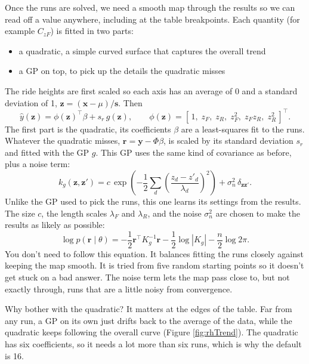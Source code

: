 Once the runs are solved, we need a smooth map through the results so we can read off a value anywhere, including at the table breakpoints. Each quantity (for example $C_{zF}$) is fitted in two parts:
\begin{itemize}
    \item a quadratic, a simple curved surface that captures the overall trend
    \item a GP on top, to pick up the details the quadratic misses
\end{itemize}
The ride heights are first scaled so each axis has an average of 0 and a standard deviation of 1, $\mathbf{z} = (\mathbf{x} - \mu)/\mathbf{s}$. Then
\begin{equation}
    \hat y(\mathbf{z}) = \phi(\mathbf{z})^{\top}\beta + s_r\,g(\mathbf{z}), \qquad \phi(\mathbf{z}) = \left[\,1,\; z_F,\; z_R,\; z_F^2,\; z_F z_R,\; z_R^2\,\right]^{\top}.
\end{equation}
The first part is the quadratic, its coefficients $\beta$ are a least-squares fit to the runs. Whatever the quadratic misses, $\mathbf{r} = \mathbf{y} - \Phi\beta$, is scaled by its standard deviation $s_r$ and fitted with the GP $g$. This GP uses the same kind of covariance as before, plus a noise term:
\begin{equation}
    k_g(\mathbf{z}, \mathbf{z}') = c\,\exp\!\left(-\frac{1}{2}\sum_d \left(\frac{z_d - z'_d}{\lambda_d}\right)^2\right) + \sigma_n^2\,\delta_{\mathbf{z}\mathbf{z}'} .
\end{equation}
Unlike the GP used to pick the runs, this one learns its settings from the results. The size $c$, the length scales $\lambda_F$ and $\lambda_R$, and the noise $\sigma_n^2$ are chosen to make the results as likely as possible:
\begin{equation}
    \log p(\mathbf{r} \mid \theta) = -\frac{1}{2}\mathbf{r}^{\top}K_g^{-1}\mathbf{r} - \frac{1}{2}\log|K_g| - \frac{n}{2}\log 2\pi.
\end{equation}
You don't need to follow this equation. It balances fitting the runs closely against keeping the map smooth. It is tried from five random starting points so it doesn't get stuck on a bad answer. The noise term lets the map pass close to, but not exactly through, runs that are a little noisy from convergence.

Why bother with the quadratic? It matters at the edges of the table. Far from any run, a GP on its own just drifts back to the average of the data, while the quadratic keeps following the overall curve (Figure \ref{fig:rhTrend}). The quadratic has six coefficients, so it needs a lot more than six runs, which is why the default is 16.

